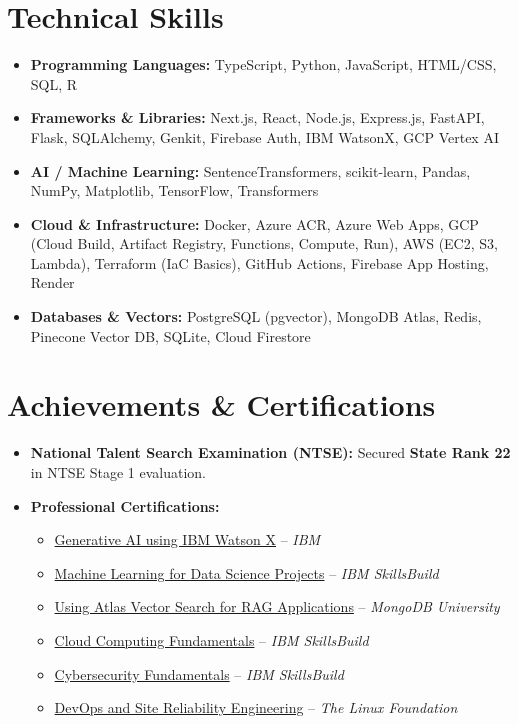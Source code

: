 \documentclass[10pt, a4paper]{article}
\begin{document}
\section*{Technical Skills}
\begin{itemize}
    \item \textbf{Programming Languages:} TypeScript, Python, JavaScript, HTML/CSS, SQL, R
    \item \textbf{Frameworks \& Libraries:} Next.js, React, Node.js, Express.js, FastAPI, Flask, SQLAlchemy, Genkit, Firebase Auth, IBM WatsonX, GCP Vertex AI
    \item \textbf{AI / Machine Learning:} SentenceTransformers, scikit-learn, Pandas, NumPy, Matplotlib, TensorFlow, Transformers
    \item \textbf{Cloud \& Infrastructure:} Docker, Azure ACR, Azure Web Apps, GCP (Cloud Build, Artifact Registry, Functions, Compute, Run), AWS (EC2, S3, Lambda), Terraform (IaC Basics), GitHub Actions, Firebase App Hosting, Render
    \item \textbf{Databases \& Vectors:} PostgreSQL (pgvector), MongoDB Atlas, Redis, Pinecone Vector DB, SQLite, Cloud Firestore
\end{itemize}

\section*{Achievements \& Certifications}
\begin{itemize}
    \item \textbf{National Talent Search Examination (NTSE):} Secured \textbf{State Rank 22} in NTSE Stage 1 evaluation.
    \item \textbf{Professional Certifications:}
    \begin{itemize}
        \item \href{https://courses.vit.skillsnetwork.site/certificates/a1992730519b41fbbe6ca9e2bdedd526}{Generative AI using IBM Watson X} -- \textit{IBM}
        \item \href{https://www.credly.com/badges/4929c042-ec7d-4721-9acf-734759de85af/public_url}{Machine Learning for Data Science Projects} -- \textit{IBM SkillsBuild}
        \item \href{https://learn.mongodb.com/c/7DQezDywQmOqalJQOWBBOg}{Using Atlas Vector Search for RAG Applications} -- \textit{MongoDB University}
        \item \href{https://www.credly.com/badges/fb8bf992-f327-4d8b-9548-97cbb4f8a622/public_url}{Cloud Computing Fundamentals} -- \textit{IBM SkillsBuild}
        \item \href{https://www.credly.com/badges/e0ed84c3-cee0-4cfb-aa59-ff68a0b98858/public_url}{Cybersecurity Fundamentals} -- \textit{IBM SkillsBuild}
        \item \href{https://www.credly.com/badges/e2544aff-14c5-481d-9a11-4b98cb544ec2/public_url}{DevOps and Site Reliability Engineering} -- \textit{The Linux Foundation}
    \end{itemize}
\end{itemize}
\end{document}
